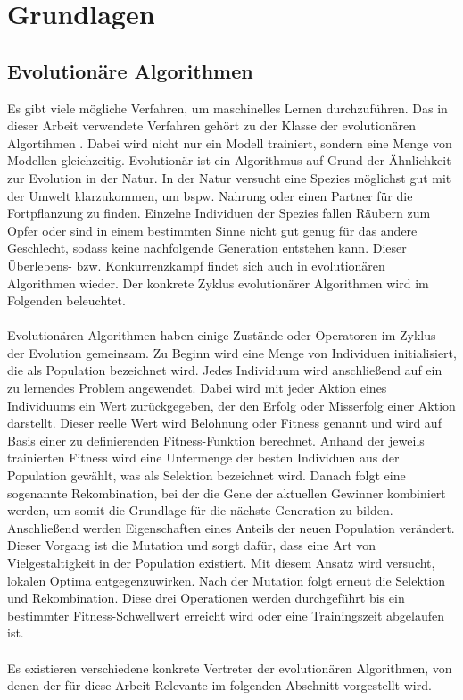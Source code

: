 
\chapter{Grundlagen}
\label{ch:FirstContent}
\section{Evolutionäre Algorithmen}
\label{sec:FirstContent:FirstSection}
Es gibt viele mögliche Verfahren, um maschinelles Lernen durchzuführen. Das in dieser Arbeit verwendete Verfahren gehört zu der Klasse der evolutionären Algortihmen \cite{dirk2018}. Dabei wird nicht nur ein Modell trainiert, sondern eine Menge von Modellen gleichzeitig. Evolutionär ist ein Algorithmus auf Grund der Ähnlichkeit zur Evolution in der Natur. In der Natur versucht eine Spezies möglichst gut mit der Umwelt klarzukommen, um bspw. Nahrung oder einen Partner für die Fortpflanzung zu finden. Einzelne Individuen der Spezies fallen Räubern zum Opfer oder sind in einem bestimmten Sinne nicht gut genug für das andere Geschlecht, sodass keine nachfolgende Generation entstehen kann. Dieser Überlebens- bzw. Konkurrenzkampf findet sich auch in evolutionären Algorithmen wieder. Der konkrete Zyklus evolutionärer Algorithmen wird im Folgenden beleuchtet.
\\
\\
Evolutionären Algorithmen haben einige Zustände oder Operatoren im Zyklus der Evolution gemeinsam. Zu Beginn wird eine Menge von Individuen initialisiert, die als Population bezeichnet wird. Jedes Individuum wird anschließend auf ein zu lernendes Problem angewendet. Dabei wird mit jeder Aktion eines Individuums ein Wert zurückgegeben, der den Erfolg oder Misserfolg einer Aktion darstellt. Dieser reelle Wert wird Belohnung oder Fitness genannt und wird auf Basis einer zu definierenden Fitness-Funktion berechnet. Anhand der jeweils trainierten Fitness wird eine Untermenge der besten Individuen aus der Population gewählt, was als Selektion bezeichnet wird. Danach folgt eine sogenannte Rekombination, bei der die Gene der aktuellen Gewinner kombiniert werden, um somit die Grundlage für die nächste Generation zu bilden. Anschließend werden Eigenschaften eines Anteils der neuen Population verändert. Dieser Vorgang ist die Mutation und sorgt dafür, dass eine Art von Vielgestaltigkeit in der Population existiert. Mit diesem Ansatz wird versucht, lokalen Optima entgegenzuwirken. Nach der Mutation folgt erneut die Selektion und Rekombination. Diese drei Operationen werden durchgeführt bis ein bestimmter Fitness-Schwellwert erreicht wird oder eine Trainingszeit abgelaufen ist.
\\\\
Es existieren verschiedene konkrete Vertreter der evolutionären Algorithmen, von denen der für diese Arbeit Relevante im folgenden Abschnitt vorgestellt wird.
